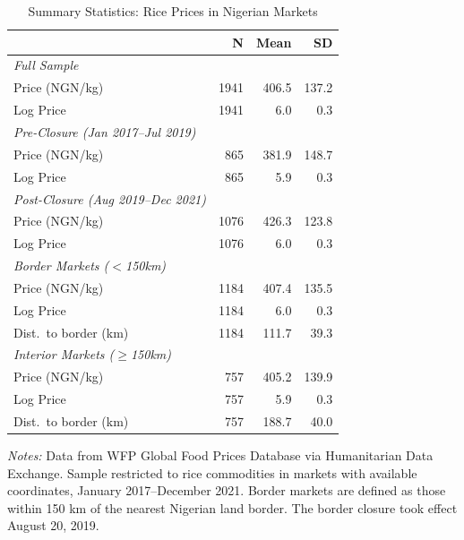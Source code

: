 \begin{table}[H]
\centering
\caption{Summary Statistics: Rice Prices in Nigerian Markets}
\label{tab:summary}
\begin{threeparttable}
\begin{tabular}{lrrr}
\toprule
 & N & Mean & SD \\
\midrule
\emph{Full Sample} &  &  &  \\
\quad Price (NGN/kg) & 1941 & 406.5 & 137.2 \\
\quad Log Price & 1941 & 6.0 & 0.3 \\
\emph{Pre-Closure (Jan 2017--Jul 2019)} &  &  &  \\
\quad Price (NGN/kg) & 865 & 381.9 & 148.7 \\
\quad Log Price & 865 & 5.9 & 0.3 \\
\emph{Post-Closure (Aug 2019--Dec 2021)} &  &  &  \\
\quad Price (NGN/kg) & 1076 & 426.3 & 123.8 \\
\quad Log Price & 1076 & 6.0 & 0.3 \\
\emph{Border Markets ($<$150km)} &  &  &  \\
\quad Price (NGN/kg) & 1184 & 407.4 & 135.5 \\
\quad Log Price & 1184 & 6.0 & 0.3 \\
\quad Dist.~to border (km) & 1184 & 111.7 & 39.3 \\
\emph{Interior Markets ($\geq$150km)} &  &  &  \\
\quad Price (NGN/kg) & 757 & 405.2 & 139.9 \\
\quad Log Price & 757 & 5.9 & 0.3 \\
\quad Dist.~to border (km) & 757 & 188.7 & 40.0 \\
\bottomrule
\end{tabular}
\begin{tablenotes}[flushleft]
\small
\item \emph{Notes:} Data from WFP Global Food Prices Database via Humanitarian Data Exchange. Sample restricted to rice commodities in markets with available coordinates, January 2017--December 2021. Border markets are defined as those within 150 km of the nearest Nigerian land border. The border closure took effect August 20, 2019.
\end{tablenotes}
\end{threeparttable}
\end{table}

